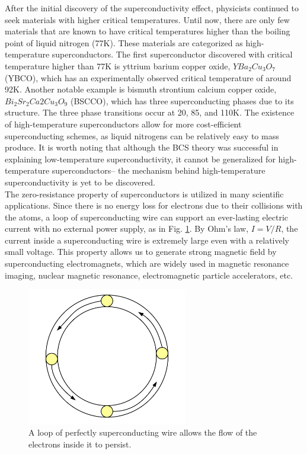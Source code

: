 \documentclass[prb,preprint]{revtex4-1}
\begin{document}
After the initial discovery of the superconductivity effect, physicists continued to seek materials with higher critical temperatures. Until now, there are only few materials that are known to have critical temperatures higher than the boiling point of liquid nitrogen (77K). These materials are categorized as high-temperature superconductors. The first superconductor discovered with critical temperature higher than 77K is yttrium barium copper oxide, $YBa_{2}Cu_{3}O_{7}$ (YBCO), which has an experimentally observed critical temperature of around 92K. Another notable example is bismuth strontium calcium copper oxide, $Bi_{2}Sr_{2}Ca{2}Cu_{3}O_{9}$ (BSCCO), which has three superconducting phases due to its structure. The three phase transitions occur at 20, 85, and 110K. The existence of high-temperature superconductors allow for more cost-efficient superconducting schemes, as liquid nitrogens can be relatively easy to mass produce. It is worth noting that although the BCS theory was successful in explaining low-temperature superconductivity, it cannot be generalized for high-temperature superconductors-- the mechanism behind high-temperature superconductivity is yet to be discovered. \\

The zero-resistance property of superconductors is utilized in many scientific applications. Since there is no energy loss for electrons due to their collisions with the atoms, a loop of superconducting wire can support an ever-lasting electric current with no external power supply, as in Fig. \ref{loop}. By Ohm's law, $I=V/R$, the current inside a superconducting wire is extremely large even with a relatively small voltage. This property allows us to generate strong magnetic field by superconducting electromagnets, which are widely used in magnetic resonance imaging, nuclear magnetic resonance, electromagnetic particle accelerators, etc.\\

\begin{figure}[h]
\centering
\includegraphics[width=70mm]{loop.png}
\caption{A loop of perfectly superconducting wire allows the flow of the electrons inside it to persist.}
\label{loop}
\end{figure}
\end{document}
